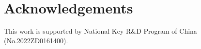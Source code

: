 \section*{Acknowledgements}
This work is supported by National Key R$\&$D Program of China (No.2022ZD0161400).